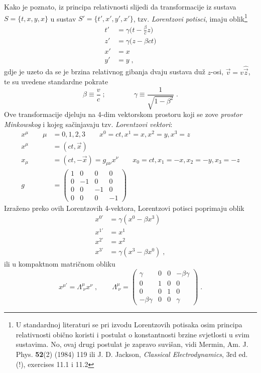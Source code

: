 Kako je poznato, iz principa relativnosti slijedi da
transformacije iz sustava $S=\{t,x,y,x\}$ u sustav $S'=\{t',x',y',x'\}$, 
tzv. \emph{Lorentzovi potisci}, imaju oblik\footnote{U
standardnoj literaturi se pri izvodu Lorentzovih potisaka osim principa
relativnosti obično koristi i postulat o konstantnosti brzine svjetlosti
u svim sustavima.  No, ovaj drugi postulat je zapravo suvišan, vidi
Mermin, Am. J. Phys. \textbf{52}(2) (1984) 119 ili J. D. Jackson,
\emph{Classical Electrodynamics}, 3rd ed.(!), exercises 11.1 i 11.2}
\begin{align}
t' &= \gamma \big(t-\frac{\beta}{c}z\big) \\
z' &= \gamma \big(z-\beta ct \big) \\
x' &= x \\
y' &= y  \;,
\end{align}
gdje je uzeto da se je brzina relativnog gibanja dvaju sustava duž
$z$-osi, $\vec{v}=v\hat{\vec{z}}$, te su uvedene standardne pokrate
\begin{displaymath}
 \beta \equiv \frac{v}{c} \;; \qquad \qquad \gamma\equiv\frac{1}{
\sqrt{1-\beta^2}} \;.
\end{displaymath}
Ove transformacije djeluju na 4-dim vektorskom prostoru koji
se zove \emph{prostor Minkowskog} i kojeg sačinjavaju tzv.
\emph{Lorentzovi vektori}: 
\begin{align}
x^\mu \qquad  \mu&=0,1,2,3  \qquad x^0=ct, x^1=x, x^2=y, x^3=z \\
x^\mu &= (ct, \vec{x}) \\
x_\mu &= (ct,-\vec{x}) = g_{\mu\nu} x^\nu
\qquad x_0=ct, x_1=-x, x_2=-y, x_3=-z \\
g &= 
\begin{pmatrix}
1 & 0 & 0 & 0 \\
0 &-1 & 0 & 0 \\
0 & 0 &-1 & 0 \\
0 & 0 & 0 &-1
\end{pmatrix}
\end{align}
Izraženo preko ovih Lorentzovih 4-vektora, Lorentzovi potisci
poprimaju oblik 
\begin{align}
x^{0'} &= \gamma (x^0 - \beta x^3 ) \\
x^{1'} &= x^1 \\
x^{2'} &= x^2  \\
x^{3'} &= \gamma (x^3 -\beta x^0 ) \;,
\end{align}
ili u kompaktnom matričnom obliku
\begin{equation}
 x^{\mu'} = \Lambda^{\mu}_{\;\nu} x^\nu \;, \qquad
\Lambda^{\mu}_{\;\nu} =
\begin{pmatrix}
\gamma & 0 & 0 & -\beta\gamma \\
0 & 1 & 0 & 0 \\
0 & 0 & 1 & 0 \\
-\beta\gamma & 0 & 0 & \gamma
\end{pmatrix} \;.
\end{equation}
